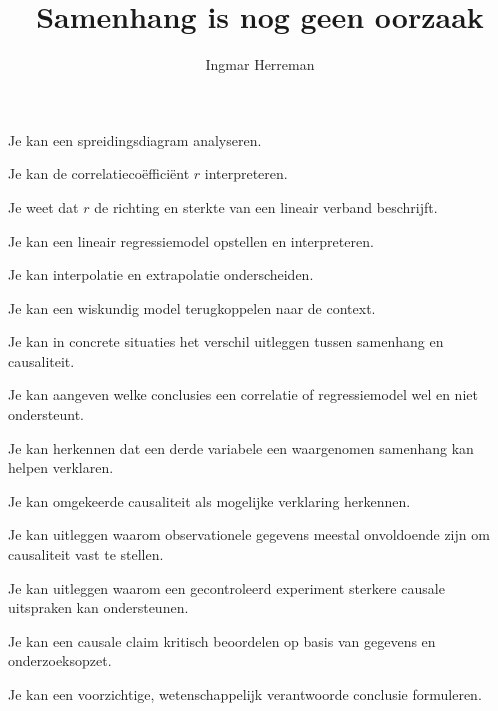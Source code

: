 \documentclass{ximera}
\title{Samenhang is nog geen oorzaak}
\author{Ingmar Herreman}
\begin{document}



















\maketitle

\begin{voorkennis}
  \item Je kan een spreidingsdiagram analyseren.
  \item Je kan de correlatiecoëfficiënt $r$ interpreteren.
  \item Je weet dat $r$ de richting en sterkte van een lineair verband beschrijft.
  \item Je kan een lineair regressiemodel opstellen en interpreteren.
  \item Je kan interpolatie en extrapolatie onderscheiden.
  \item Je kan een wiskundig model terugkoppelen naar de context.
\end{voorkennis}

\begin{leerdoelen}
  \item Je kan in concrete situaties het verschil uitleggen tussen samenhang en causaliteit.
  \item Je kan aangeven welke conclusies een correlatie of regressiemodel wel en niet ondersteunt.
  \item Je kan herkennen dat een derde variabele een waargenomen samenhang kan helpen verklaren.
  \item Je kan omgekeerde causaliteit als mogelijke verklaring herkennen.
  \item Je kan uitleggen waarom observationele gegevens meestal onvoldoende zijn om causaliteit vast te stellen.
  \item Je kan uitleggen waarom een gecontroleerd experiment sterkere causale uitspraken kan ondersteunen.
  \item Je kan een causale claim kritisch beoordelen op basis van gegevens en onderzoeksopzet.
  \item Je kan een voorzichtige, wetenschappelijk verantwoorde conclusie formuleren.
\end{leerdoelen}
\end{document}
